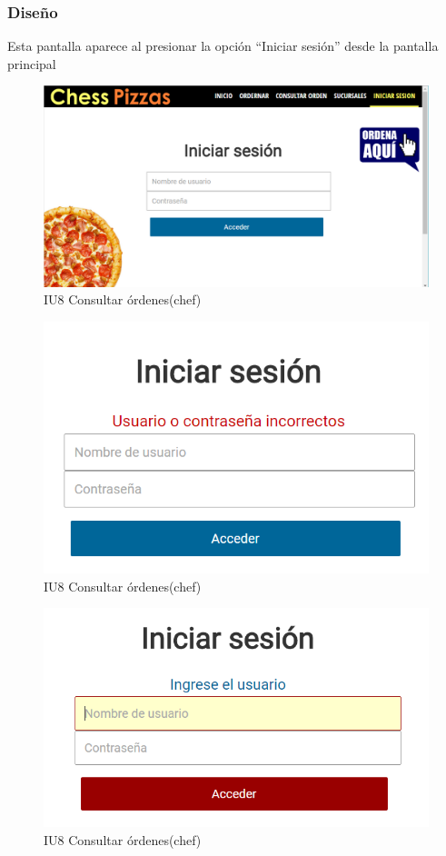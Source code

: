 \documentclass[oneside,10pt]{book}
\begin{document}
\subsubsection{Diseño}
Esta pantalla aparece al presionar la opción ``Iniciar sesión'' desde la pantalla principal


\begin{figure}[htbp!]
	\centering
	\includegraphics[width=1\textwidth]{img/iniciar_sesion}
	\caption{IU8 Consultar órdenes(chef)}
\end{figure}

\begin{figure}[htbp!]
	\centering
	\includegraphics[width=1\textwidth]{img/iniciar_sesion2a}
	\caption{IU8 Consultar órdenes(chef)}
\end{figure}

\begin{figure}[htbp!]
	\centering
	\includegraphics[width=1\textwidth]{img/iniciar_sesion2b}
	\caption{IU8 Consultar órdenes(chef)}
\end{figure}
\end{document}
